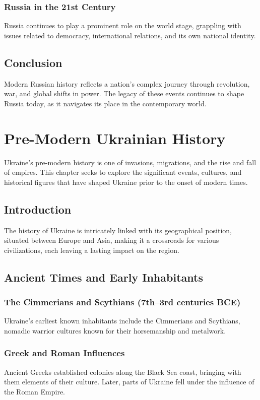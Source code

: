 \documentclass[a4paper,12pt]{book}
\begin{document}
\subsection{Russia in the 21st Century}
Russia continues to play a prominent role on the world stage, grappling with issues related to democracy, international relations, and its own national identity.

\section{Conclusion}
\label{sec:conclusion-modern-russia}
Modern Russian history reflects a nation’s complex journey through revolution, war, and global shifts in power. The legacy of these events continues to shape Russia today, as it navigates its place in the contemporary world.

\chapter{Pre-Modern Ukrainian History}
\label{ch:pre-modern-ukrainian-history}

Ukraine's pre-modern history is one of invasions, migrations, and the rise and fall of empires. This chapter seeks to explore the significant events, cultures, and historical figures that have shaped Ukraine prior to the onset of modern times.

\section{Introduction}
\label{sec:introduction-pre-modern-ukraine}
The history of Ukraine is intricately linked with its geographical position, situated between Europe and Asia, making it a crossroads for various civilizations, each leaving a lasting impact on the region.

\section{Ancient Times and Early Inhabitants}
\label{sec:ancient-times-early-inhabitants}
\subsection{The Cimmerians and Scythians (7th–3rd centuries BCE)}
Ukraine’s earliest known inhabitants include the Cimmerians and Scythians, nomadic warrior cultures known for their horsemanship and metalwork.

\subsection{Greek and Roman Influences}
Ancient Greeks established colonies along the Black Sea coast, bringing with them elements of their culture. Later, parts of Ukraine fell under the influence of the Roman Empire.
\end{document}
